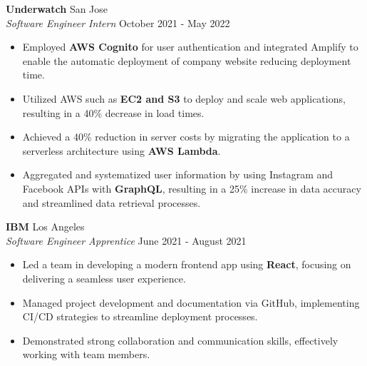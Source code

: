 \documentclass[a4paper,10pt]{article}
\begin{document}
\vspace{3mm}

\noindent \textbf{Underwatch} \hfill {San Jose}\\
\textit{Software Engineer Intern} \hfill {October 2021 - May 2022}\vspace{-\baselineskip}
\vspace{2.5mm}
\begin{itemize}
    \item Employed \textbf{AWS Cognito} for user authentication and integrated Amplify to enable the automatic deployment of company website reducing deployment time. \vspace{0.3ex}
    \item Utilized AWS such as \textbf{EC2 and S3} to deploy and scale web applications, resulting in a 40\% decrease in load times.\vspace{0.3ex}
    \item Achieved a 40\% reduction in server costs by migrating the application to a serverless architecture using \textbf{AWS Lambda}.\vspace{0.3ex}
    \item Aggregated and systematized user information by using Instagram and Facebook APIs with \textbf{GraphQL}, resulting in a 25\% increase in data accuracy and streamlined data retrieval processes. \vspace{0.3ex}
\end{itemize}

\vspace{3mm}

\noindent \textbf{IBM} \hfill {Los Angeles}\\
\textit{Software Engineer Apprentice} \hfill {June 2021 - August 2021}\vspace{-\baselineskip}
\vspace{2.5mm}
\begin{itemize}
    \item Led a team in developing a modern frontend app using \textbf{React}, focusing on delivering a seamless user experience.\vspace{0.3ex}
    \item Managed project development and documentation via GitHub, implementing CI/CD strategies to streamline deployment processes.\vspace{0.3ex}
    \item Demonstrated strong collaboration and communication skills, effectively working with team members.\vspace{0.3ex}
\end{itemize}
\end{document}
